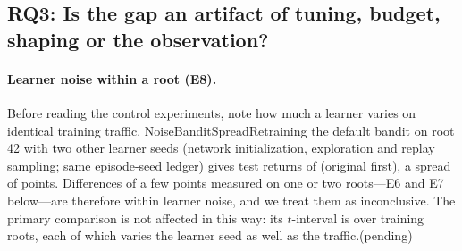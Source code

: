 \subsection{RQ3: Is the gap an artifact of tuning, budget, shaping or the observation?}
\label{sec:rq3}
\newcommand{\ifmacro}[3]{\ifcsname #1\endcsname #2\else #3\fi}

\paragraph{Learner noise within a root (E8).} Before reading the control
experiments, note how much a learner varies on identical training traffic.
\ifmacro{NoiseBanditSpread}{Retraining the default bandit on root 42 with two
other learner seeds (network initialization, exploration and replay sampling;
same episode-seed ledger) gives test returns of \NoiseBanditVals{} (original
first), a spread of \NoiseBanditSpread{} points. Differences of a few points
measured on one or two roots---E6 and E7 below---are therefore within learner
noise, and we treat them as inconclusive. The primary comparison is not
affected in this way: its $t$-interval is over training roots, each of which
varies the learner seed as well as the traffic.}{(pending)}

